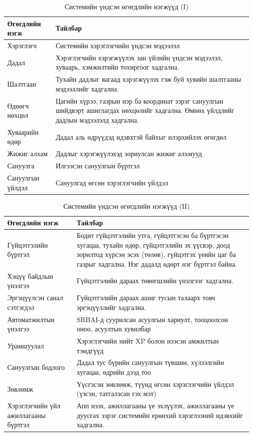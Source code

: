 \begin{table}[htbp]
\centering
\small
\setlength{\tabcolsep}{4pt}
\begin{tabular}{|L{4.6cm}|L{8.4cm}|}
\hline
\textbf{Өгөгдлийн нэгж} & \textbf{Тайлбар} \\
\hline
Хэрэглэгч & Системийн хэрэглэгчийн үндсэн мэдээлэл \\
\hline
Дадал & Хэрэглэгчийн хэрэгжүүлэх зан үйлийн үндсэн мэдээлэл, хуваарь, хэмжилтийн тохиргоог хадгална. \\
\hline
Шалтгаан & Тухайн дадлыг яагаад хэрэгжүүлэх гэж буй хувийн шалтгааны мэдээллийг хадгална. \\
\hline
Өдөөгч нөхцөл & Цагийн хүрээ, газрын нэр ба координат зэрэг сануулгын шийдвэрт ашиглагдах нөхцөлийг хадгална. Өмнөх үйлдлийг дадлын мэдээлэлд хадгална. \\
\hline
Хуваарийн өдөр & Дадал аль өдрүүдэд идэвхтэй байхыг илэрхийлэх өгөгдөл \\
\hline
Жижиг алхам & Дадлыг хэрэгжүүлэхэд зориулсан жижиг алхмууд \\
\hline
Сануулга & Илгээсэн сануулгын бүртгэл \\
\hline
Сануулгын үйлдэл & Сануулгад өгсөн хэрэглэгчийн үйлдэл \\
\hline
\end{tabular}
\caption{Системийн үндсэн өгөгдлийн нэгжүүд (I)}
\end{table}

\begin{table}[htbp]
\centering
\small
\setlength{\tabcolsep}{4pt}
\begin{tabular}{|L{4.6cm}|L{8.4cm}|}
\hline
\textbf{Өгөгдлийн нэгж} & \textbf{Тайлбар} \\
\hline
Гүйцэтгэлийн бүртгэл & Бодит гүйцэтгэлийн утга, гүйцэтгэсэн ба бүртгэсэн хугацаа, тухайн өдөр, гүйцэтгэлийн эх үүсвэр, доод зорилтод хүрсэн эсэх (төлөв), гүйцэтгэх үеийн цаг ба газрыг хадгална. Нэг дадалд өдөрт нэг бүртгэл байна. \\
\hline
Хэцүү байдлын үнэлгээ & Гүйцэтгэлийн дараах төвөгшлийн үнэлгээг хадгална. \\
\hline
Эргэцүүлсэн санал сэтгэгдэл & Гүйцэтгэлийн дараах ашиг тусын талаарх товч эргэцүүллийг хадгална. \\
\hline
Автоматжилтын үнэлгээ & SRBAI-д суурилсан асуулгын хариулт, тооцоолсон оноо, асуултын хувилбар \\
\hline
Урамшуулал & Хэрэглэгчийн нийт XP болон нээсэн амжилтын тэмдгүүд \\
\hline
Сануулгын бодлого & Дадал тус бүрийн сануулгын түвшин, хүлээлгийн хугацаа, өдрийн дээд тоо \\
\hline
Зөвлөмж & Үүсгэсэн зөвлөмж, түүнд өгсөн хэрэглэгчийн үйлдэл (үзсэн, татгалзсан гэх мэт) \\
\hline
Хэрэглэгчийн үйл ажиллагааны бүртгэл & Апп нээх, ажиллагааны үе эхлүүлэх, ажиллагааны үе дуусгах зэрэг системийн ерөнхий хэрэглээний идэвхийг хадгална. \\
\hline
\end{tabular}
\caption{Системийн үндсэн өгөгдлийн нэгжүүд (II)}
\end{table}

